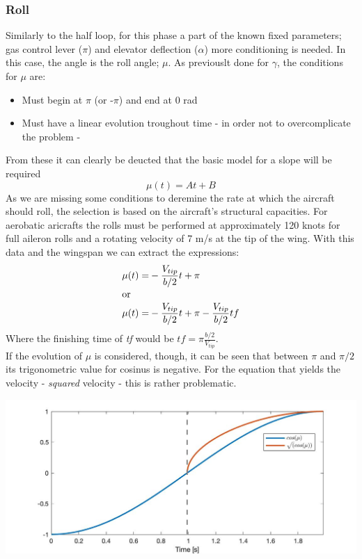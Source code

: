 \subsubsection*{Roll}
Similarly to the half loop, for this phase a part of the known fixed parameters; gas control lever ($\pi$) and elevator deflection ($\alpha$) more conditioning is needed. In this case, the angle is the roll angle; $\mu$. As previouslt done for $\gamma$, the conditions for $\mu$ are:

\begin{itemize}
	\item Must begin at $\pi$ (or -$\pi$) and end at 0 rad
	\item Must have a linear evolution troughout time - in order not to overcomplicate the problem -
\end{itemize}

From these it can clearly be deucted that the basic model for a slope will be required
\[\mu(t)=At+B\]
As we are missing some conditions to deremine the rate at which the aircraft should roll, the selection is based on the aircraft's structural capacities. For aerobatic aricrafts the rolls must be performed at approximately 120 knots for full aileron rolls and a rotating velocity of 7 m/s at the tip of the wing. With this data and the wingspan we can extract the expressions:
\begin{align}
	\mu(t)=&-\frac{V_{tip}}{b/2}t+\pi \\
	\intertext{or} 
	\mu(t)=&-\frac{V_{tip}}{b/2}t+\pi-\frac{V_{tip}}{b/2}tf
\end{align}
Where the finishing time of \textit{tf} would be $tf=\pi \frac{b/2}{V_{tip}}$.\\
If the evolution of $\mu$ is considered, though, it can be seen that between $\pi$ and $\pi/2$ its trigonometric value for cosinus is negative. For the equation that yields the velocity - \textit{squared} velocity - this is rather problematic.\\

\begin{center}
	\includegraphics[width=\linewidth]{../matlab/3/sqrt.jpg}
	\vspace{0.5cm}
	\vspace{0.25cm}
\end{center}

